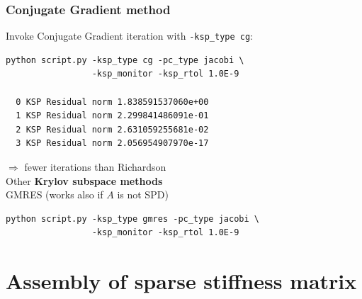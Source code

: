 \documentclass{beamer}
\begin{document}
\begin{frame}[fragile]
  \frametitle{Conjugate Gradient method}
  Invoke Conjugate Gradient iteration with \lstinline{-ksp_type cg}:
  \begin{verbatim}
python script.py -ksp_type cg -pc_type jacobi \
                 -ksp_monitor -ksp_rtol 1.0E-9 

  0 KSP Residual norm 1.838591537060e+00
  1 KSP Residual norm 2.299841486091e-01
  2 KSP Residual norm 2.631059255681e-02
  3 KSP Residual norm 2.056954907970e-17
  \end{verbatim}
  $\Rightarrow$ fewer iterations than Richardson\\[2ex]
  Other \textbf{Krylov subspace methods}\\
  GMRES (works also if $A$ is not SPD)
  \begin{verbatim}
python script.py -ksp_type gmres -pc_type jacobi \
                 -ksp_monitor -ksp_rtol 1.0E-9 

  \end{verbatim}
\end{frame}


\section{Assembly of sparse stiffness matrix}


\begin{frame}
  \tableofcontents[currentsection]
\end{frame}

\end{document}
